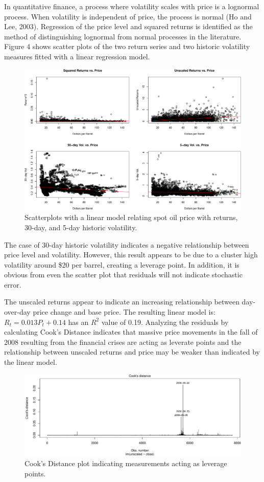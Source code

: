\documentclass[]{article}
\begin{document}
In quantitative finance, a process where volatility scales with price is
a lognormal process. When volatility is independent of price, the
process is normal (Ho and Lee, 2003). Regression of the price level and
squared returns is identified as the method of distinguishing lognormal
from normal processes in the literature. Figure 4 shows scatter plots of
the two return series and two historic volatility measures fitted with a
linear regression model.

\begin{figure}[htbp]
\centering
\includegraphics{Figs/unnamed-chunk-8-1.pdf}
\caption{Scatterplots with a linear model relating spot oil price with
returns, 30-day, and 5-day historic volatility.}
\end{figure}

The case of 30-day historic volatility indicates a negative relationship
between price level and volatility. However, this result appears to be
due to a cluster high volatility around \$20 per barrel, creating a
leverage point. In addition, it is obvious from even the scatter plot
that residuals will not indicate stochastic error.

The unscaled returns appear to indicate an increasing relationship
between day-over-day price change and base price. The resulting linear
model is: \(R_t = 0.013P_t+0.14\) has an \(R^2\) value of 0.19.
Analyzing the residuals by calculating Cook's Distance indicates that
massive price movements in the fall of 2008 resulting from the financial
crises are acting as leverate points and the relationship between
unscaled returns and price may be weaker than indicated by the linear
model.

\begin{figure}[htbp]
\centering
\includegraphics{Figs/unnamed-chunk-9-1.pdf}
\caption{Cook's Distance plot indicating measurements acting as leverage
points.}
\end{figure}
\end{document}
